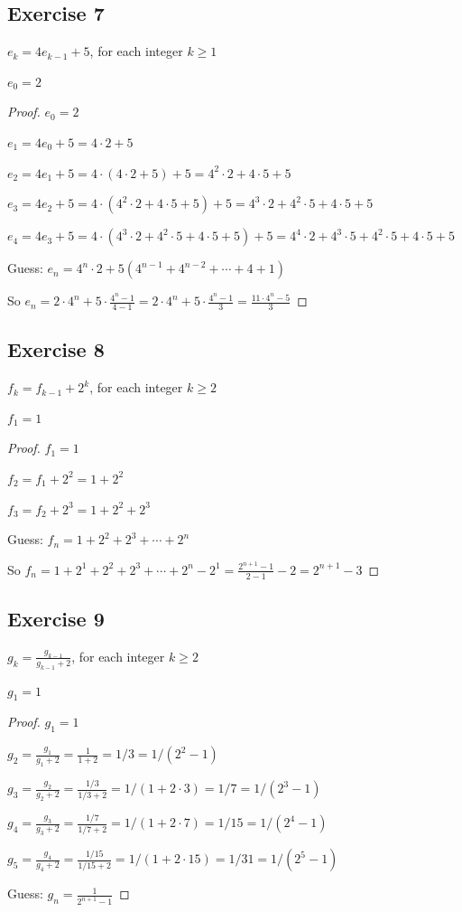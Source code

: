 \documentclass[14pt]{extarticle}
\newcommand{\dps}{\displaystyle}
\begin{document}
\subsection{Exercise 7}
\(e_k = 4e_{k-1} + 5\), for each integer \(k \geq 1\)

\(e_0 = 2\)

\begin{proof}
\(e_0 = 2\)

\(e_1 = 4e_0 + 5 = 4 \cdot 2 + 5\)

\(e_2 = 4e_1 + 5 = 4 \cdot (4 \cdot 2 + 5) + 5 = 4^2 \cdot 2 + 4 \cdot 5 + 5\)

\(e_3 = 4e_2 + 5 = 4 \cdot (4^2 \cdot 2 + 4 \cdot 5 + 5) + 5 = 4^3 \cdot 2 + 4^2 \cdot 5 + 4 \cdot 5 + 5\)

\(e_4 = 4e_3 + 5 = 4 \cdot (4^3 \cdot 2 + 4^2 \cdot 5 + 4 \cdot 5 + 5) + 5 
= 4^4 \cdot 2 + 4^3 \cdot 5 + 4^2 \cdot 5 + 4 \cdot 5 + 5\)

Guess: \(e_n = 4^n \cdot 2 + 5(4^{n-1} + 4^{n-2} + \cdots + 4 + 1)\)

So \(\dps e_n = 2 \cdot 4^n + 5 \cdot \frac{4^n - 1}{4-1} = 2 \cdot 4^n + 5 \cdot \frac{4^n - 1}{3} = \frac{11 \cdot 4^n - 5}{3}\)
\end{proof}

\subsection{Exercise 8}
\(f_k = f_{k-1} + 2^k\), for each integer \(k \geq 2\)

\(f_1 = 1\)

\begin{proof}
\(f_1 = 1\)

\(f_2 = f_1 + 2^2 = 1 + 2^2\)

\(f_3 = f_2 + 2^3 = 1 + 2^2 + 2^3\)

Guess: \(f_n = 1 + 2^2 + 2^3 + \cdots + 2^n\)

So \(f_n = 1 + 2^1 + 2^2 + 2^3 + \cdots + 2^n - 2^1 = \dps\frac{2^{n+1}-1}{2-1} - 2 = 2^{n+1} - 3\)
\end{proof}

\subsection{Exercise 9}
\(g_k = \dps \frac{g_{k-1}}{g_{k-1} + 2}\), for each integer \(k \geq 2\)

\(g_1 = 1\)

\begin{proof}
\(g_1 = 1\)

\(g_2 = \dps \frac{g_1}{g_1 + 2} = \frac{1}{1 + 2} = 1/3 = 1/(2^2 - 1)\)

\(g_3 = \dps \frac{g_2}{g_2 + 2} = \frac{1/3}{1/3 + 2} = 1/(1 + 2 \cdot 3) = 1 / 7 = 1 / (2^3 - 1)\)

\(g_4 = \dps \frac{g_3}{g_3 + 2} = \frac{1/7}{1/7 + 2} = 1/(1 + 2 \cdot 7) = 1/15 = 1 / (2^4 - 1)\)

\(g_5 = \dps \frac{g_4}{g_4 + 2} = \frac{1/15}{1/15 + 2} = 1/(1 + 2 \cdot 15) = 1/31 = 1 / (2^5 - 1)\)

Guess: \(\dps g_n = \frac{1}{2^{n+1} - 1}\)
\end{proof}
\end{document}
